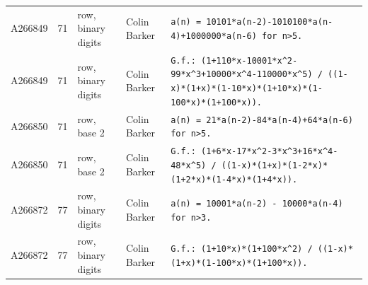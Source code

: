 \documentclass[11pt]{article}
\theoremstyle{definition}
\theoremstyle{remark}
\begin{document}
{\begin{longtable}{p{1.3cm}p{0.7cm}p{2.4cm}p{2.3cm}p{7.3cm}}
A266849 & 71 & row, binary digits & Colin Barker & \texttt{a(n)\allowbreak{} \allowbreak{}=\allowbreak{} \allowbreak{}10101*\allowbreak{}a(n-\allowbreak{}2)\allowbreak{}-\allowbreak{}1010100*\allowbreak{}a(n-\allowbreak{}4)\allowbreak{}+\allowbreak{}1000000*\allowbreak{}a(n-\allowbreak{}6)\allowbreak{} \allowbreak{}for \allowbreak{}n>5.} \\
A266849 & 71 & row, binary digits & Colin Barker & \texttt{G.f.: \allowbreak{}(1+\allowbreak{}110*\allowbreak{}x-\allowbreak{}10001*\allowbreak{}x\^{}2-\allowbreak{}99*\allowbreak{}x\^{}3+\allowbreak{}10000*\allowbreak{}x\^{}4-\allowbreak{}110000*\allowbreak{}x\^{}5)\allowbreak{} \allowbreak{}/\allowbreak{} \allowbreak{}((1-\allowbreak{}x)\allowbreak{}*\allowbreak{}(1+\allowbreak{}x)\allowbreak{}*\allowbreak{}(1-\allowbreak{}10*\allowbreak{}x)\allowbreak{}*\allowbreak{}(1+\allowbreak{}10*\allowbreak{}x)\allowbreak{}*\allowbreak{}(1-\allowbreak{}100*\allowbreak{}x)\allowbreak{}*\allowbreak{}(1+\allowbreak{}100*\allowbreak{}x)\allowbreak{})\allowbreak{}.} \\
A266850 & 71 & row, base 2 & Colin Barker & \texttt{a(n)\allowbreak{} \allowbreak{}=\allowbreak{} \allowbreak{}21*\allowbreak{}a(n-\allowbreak{}2)\allowbreak{}-\allowbreak{}84*\allowbreak{}a(n-\allowbreak{}4)\allowbreak{}+\allowbreak{}64*\allowbreak{}a(n-\allowbreak{}6)\allowbreak{} \allowbreak{}for \allowbreak{}n>5.} \\
A266850 & 71 & row, base 2 & Colin Barker & \texttt{G.f.: \allowbreak{}(1+\allowbreak{}6*\allowbreak{}x-\allowbreak{}17*\allowbreak{}x\^{}2-\allowbreak{}3*\allowbreak{}x\^{}3+\allowbreak{}16*\allowbreak{}x\^{}4-\allowbreak{}48*\allowbreak{}x\^{}5)\allowbreak{} \allowbreak{}/\allowbreak{} \allowbreak{}((1-\allowbreak{}x)\allowbreak{}*\allowbreak{}(1+\allowbreak{}x)\allowbreak{}*\allowbreak{}(1-\allowbreak{}2*\allowbreak{}x)\allowbreak{}*\allowbreak{}(1+\allowbreak{}2*\allowbreak{}x)\allowbreak{}*\allowbreak{}(1-\allowbreak{}4*\allowbreak{}x)\allowbreak{}*\allowbreak{}(1+\allowbreak{}4*\allowbreak{}x)\allowbreak{})\allowbreak{}.} \\
A266872 & 77 & row, binary digits & Colin Barker & \texttt{a(n)\allowbreak{} \allowbreak{}=\allowbreak{} \allowbreak{}10001*\allowbreak{}a(n-\allowbreak{}2)\allowbreak{} \allowbreak{}-\allowbreak{} \allowbreak{}10000*\allowbreak{}a(n-\allowbreak{}4)\allowbreak{} \allowbreak{}for \allowbreak{}n>3.} \\
A266872 & 77 & row, binary digits & Colin Barker & \texttt{G.f.: \allowbreak{}(1+\allowbreak{}10*\allowbreak{}x)\allowbreak{}*\allowbreak{}(1+\allowbreak{}100*\allowbreak{}x\^{}2)\allowbreak{} \allowbreak{}/\allowbreak{} \allowbreak{}((1-\allowbreak{}x)\allowbreak{}*\allowbreak{}(1+\allowbreak{}x)\allowbreak{}*\allowbreak{}(1-\allowbreak{}100*\allowbreak{}x)\allowbreak{}*\allowbreak{}(1+\allowbreak{}100*\allowbreak{}x)\allowbreak{})\allowbreak{}.} \\

\end{longtable}}
\end{document}
